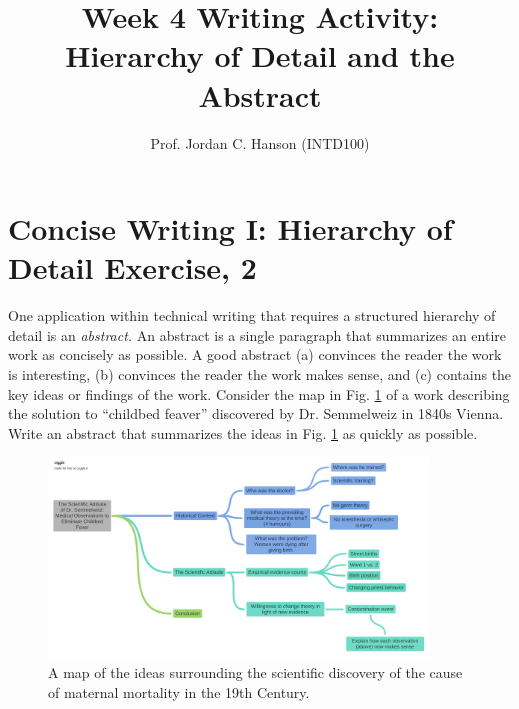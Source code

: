 \documentclass{article}
\begin{document}
\title{Week 4 Writing Activity: Hierarchy of Detail and the Abstract}
\author{Prof. Jordan C. Hanson (INTD100)}

\maketitle

\section{Concise Writing I: Hierarchy of Detail Exercise, 2}

One application within technical writing that requires a structured hierarchy of detail is an \textit{abstract.}  An abstract is a single paragraph that summarizes an entire work as concisely as possible.  A good abstract (a) convinces the reader the work is interesting, (b) convinces the reader the work makes sense, and (c) contains the key ideas or findings of the work.  Consider the map in Fig. \ref{fig:1} of a work describing the solution to ``childbed feaver'' discovered by Dr. Semmelweiz in 1840s Vienna.  Write an abstract that summarizes the ideas in Fig. \ref{fig:1} as quickly as possible. \\ \vspace{6cm}

\begin{figure}[hb]
\centering
\includegraphics[width=0.9\textwidth]{figures/semmelweiz.pdf}
\caption{\label{fig:1} A map of the ideas surrounding the scientific discovery of the cause of maternal mortality in the 19th Century.}
\end{figure}
\end{document}

